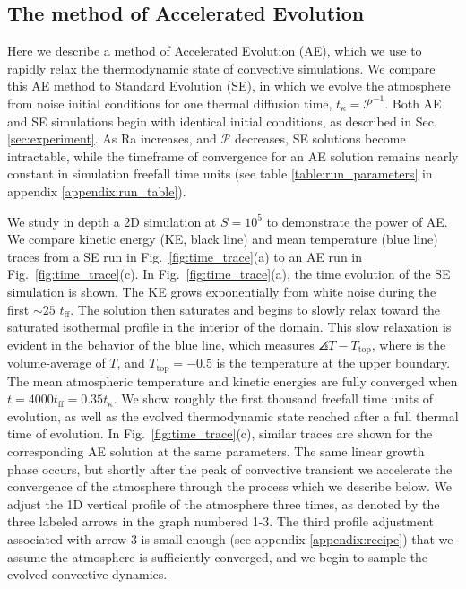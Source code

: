 
\subsection{The method of Accelerated Evolution}
\label{sec:ae}
Here we describe a method of Accelerated Evolution (AE), which we use 
to rapidly relax the thermodynamic state of convective simulations.  
We compare this AE method to Standard Evolution
(SE), in which we evolve the atmosphere from noise initial conditions
for one thermal diffusion time,
$t_\kappa = \mathcal{P}^{-1}$. Both AE and SE simulations begin with identical
initial conditions, as described in Sec. \ref{sec:experiment}.
As Ra increases, and $\mathcal{P}$ decreases, SE solutions become intractable, 
while the timeframe of convergence for an AE solution remains nearly constant
in simulation freefall time units (see table \ref{table:run_parameters} in
appendix \ref{appendix:run_table}).

We study in depth a 2D simulation at $S = 10^5$ to demonstrate the power of AE.
We compare kinetic energy (KE, black line) and mean temperature (blue line)
traces from a SE run in Fig.~\ref{fig:time_trace}(a) to an AE run
in Fig.~\ref{fig:time_trace}(c).
In Fig.~\ref{fig:time_trace}(a), the time evolution of the SE simulation is shown.
The KE grows exponentially from white noise during the
first $\sim 25$ $t_{\text{ff}}$. The solution then saturates and begins to slowly
relax toward the saturated isothermal profile in the interior of the domain.
This slow relaxation is evident in the behavior of the blue line, which measures
$\angles{T} - T_{\text{top}}$, where  is the volume-average of $T$, and
$T_{\text{top}} = -0.5$ is the temperature at the upper boundary.
The mean atmospheric temperature and
kinetic energies are fully converged when $t = 4000t_{\text{ff}} = 0.35t_{\kappa}$.
We show roughly the first thousand freefall time
units of evolution, as well as the evolved thermodynamic state reached after a full
thermal time of evolution.  In Fig.~\ref{fig:time_trace}(c), similar traces are
shown for the corresponding AE solution
at the same parameters. The same linear growth phase occurs, but shortly after
the peak of convective transient we accelerate the convergence of the atmosphere
through the process which we describe below. We adjust the 1D vertical profile of
the atmosphere three times, as denoted by the three labeled
arrows in the graph numbered 1-3.  The third profile adjustment associated with
arrow 3 is small enough (see appendix \ref{appendix:recipe}) that we assume
the atmosphere is sufficiently converged, and we begin to sample the evolved
convective dynamics.

